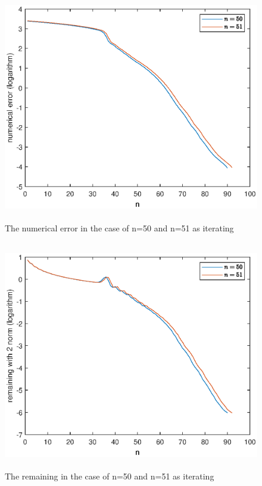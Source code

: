 \documentclass[UTF8,a4paper,10pt]{ctexart}
\begin{document}
\begin{figure}[ht]
    \centering
    \includegraphics[width=14cm,height=10cm]{2.6_error.eps}
    \caption{The numerical error in the case of n=50 and n=51 as iterating}
\end{figure}
\begin{figure}[ht]
    \centering
    \includegraphics[width=14cm,height=10cm]{2.6_remaining.eps}
    \caption{The remaining in the case of n=50 and n=51 as iterating}
\end{figure}
\end{document}

